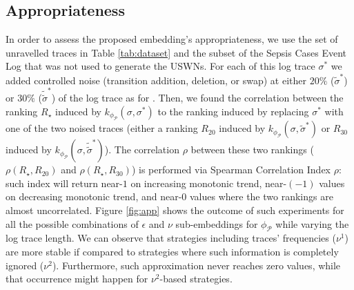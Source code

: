 \subsection{Appropriateness}\label{subsec:apprp}
In order to assess the proposed embedding's appropriateness, we use the set of unravelled traces in Table \ref{tab:dataset} and the subset of the Sepsis Cases Event Log that was not used to generate the USWNs. For each of this log trace $\sigma^*$ we added controlled noise (transition addition, deletion, or swap) at either $20\%$ ($\tilde{\sigma}^*$) or $30\%$ ($\tilde{\tilde{{\sigma}}}^*$) of the log trace as for \cite{LeoniM17}. Then, we found the correlation between the ranking $R_\star$ induced by $k_{\phi_{\mathcal{P}}}(\sigma,\sigma^*)$ to the ranking induced by replacing $\sigma^*$ with one of the two noised traces (either a ranking $R_{20}$ induced by $k_{\phi_{\mathcal{P}}}(\sigma,\tilde{\sigma}^*)$ or $R_{30}$ induced by $k_{\phi_{\mathcal{P}}}(\sigma,\tilde{\tilde{\sigma}}^*)$). The correlation $\rho$ between these two rankings ($\rho(R_\star,R_{20})$ and $\rho(R_\star,R_{30})$) is performed via Spearman Correlation Index $\rho$: such index will return near-$1$ on increasing monotonic trend, near-$(-1)$ values on decreasing monotonic trend, and near-$0$ values where the two rankings are almost uncorrelated. Figure \ref{fig:app} shows the outcome of such experiments for all the possible combinations of $\epsilon$ and $\nu$ sub-embeddings for $\phi_{\mathcal{P}}$ while varying the log trace length. We can observe that strategies including traces' frequencies ($\nu^1$) are more stable if compared to strategies where such information is completely ignored ($\nu^2$). Furthermore, such approximation never reaches zero values, while that occurrence might happen for $\nu^2$-based strategies.

